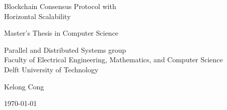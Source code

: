 \begin{titlepage}

  \begin{center}
  \null\vfill
    \begin{center}
    \LARGE{Blockchain Consensus Protocol with\\Horizontal Scalability}
    \end{center}

    \vspace{3cm}

    \begin{large}
    Master's Thesis in Computer Science
    \end{large}

    \vspace{1.5cm}

    \begin{normalsize}
    Parallel and Distributed Systems group\\
    Faculty of Electrical Engineering, Mathematics, and Computer Science\\
    Delft University of Technology
    \end{normalsize}

    \vspace{2.0cm}

    \begin{normalsize}
    Kelong Cong
    \end{normalsize}

    \vspace{1.0cm}

    \today            %

  \vfill
  \end{center}

\end{titlepage}

